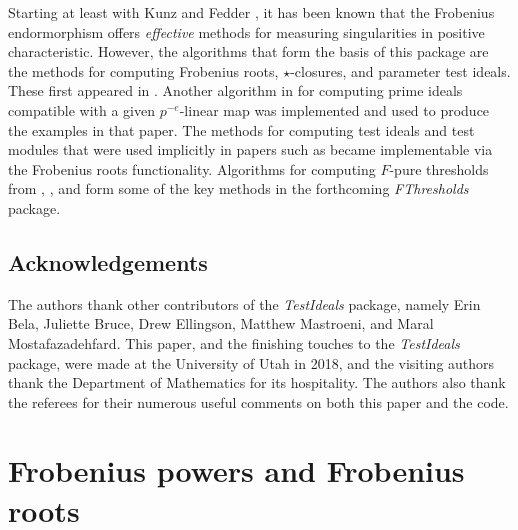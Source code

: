 \documentclass{amsart}
\begin{document}
Starting at least with Kunz \cite{KunzCharacterizationsOfRegularLocalRings} and Fedder \cite{FedderFPureRat}, it has been known that the Frobenius endormorphism offers \emph{effective} methods for measuring singularities in positive characteristic.
However, the algorithms that form the basis of this package are the methods for computing Frobenius roots, $\star$-closures, and parameter test ideals.
These first appeared in \cite{KatzmanParameterTestIdealOfCMRings,BlickleMustataSmithDiscretenessAndRationalityOfFThresholds,BlickleMustataSmithFThresholdsOfHypersurfaces,KatzmanFrobeniusMapsOnInjectiveHulls}.
Another algorithm in \cite{KatzmanSchwedeAlgorithm} for computing prime ideals compatible with a given $p^{-e}$-linear map was implemented and used to produce the examples in that paper.  The methods for computing test ideals and test modules that were used implicitly in papers such as \cite{BlickleSchwedeTakagiZhang,KatzmanLyubeznikZhangOnDiscretenessAndRationality,SchwedeTuckerTestIdealFiniteMaps} became implementable via the Frobenius roots functionality.
Algorithms for computing $F$-pure thresholds from \cite{HernandezFInvariantsOfDiagonalHyp}, \cite{HernandezFPureThresholdOfBinomial}, and \cite{HernandezTeixeiraFThresholdFunctions} form some of the key methods in the forthcoming \emph{FThresholds} package.

\subsection*{Acknowledgements}
The authors thank other contributors of the \emph{TestIdeals} package, namely
Erin Bela, Juliette Bruce, Drew Ellingson, Matthew Mastroeni, and Maral Mostafazadehfard.
This paper, and the finishing touches to the \emph{TestIdeals} package, were made at the University of Utah in 2018, and the visiting authors thank the Department of Mathematics for its hospitality.  The authors also thank the referees for their numerous useful comments on both this paper and the code.

\section{Frobenius powers and Frobenius roots}\label{Section: Frobenius powers and Frobenius roots}
\end{document}
